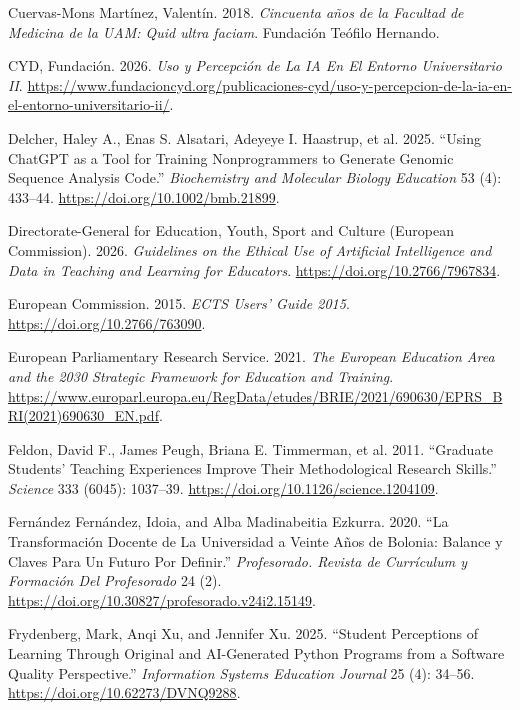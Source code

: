 \documentclass[
  11pt,
  a4paper,
  twoside]{scrreprt}
\newlength{\cslhangindent}
\newenvironment{CSLReferences}[2] %
 {\begin{list}{}{%
  \setlength{\itemindent}{0pt}
  \setlength{\leftmargin}{0pt}
  \setlength{\parsep}{0pt}
  \ifodd #1
   \setlength{\leftmargin}{\cslhangindent}
   \setlength{\itemindent}{-1\cslhangindent}
  \fi
  \setlength{\itemsep}{#2\baselineskip}}}
 {\end{list}}
\begin{document}
\begin{CSLReferences}{1}{1}
Cuervas-Mons Martínez, Valentín. 2018. \emph{Cincuenta años de la
Facultad de Medicina de la UAM: Quid ultra faciam}. Fundación Teófilo
Hernando.

CYD, Fundación. 2026. \emph{Uso y Percepción de La {IA} En El Entorno
Universitario {II}}.
\url{https://www.fundacioncyd.org/publicaciones-cyd/uso-y-percepcion-de-la-ia-en-el-entorno-universitario-ii/}.

Delcher, Haley A., Enas S. Alsatari, Adeyeye I. Haastrup, et al. 2025.
{``Using ChatGPT as a Tool for Training Nonprogrammers to Generate
Genomic Sequence Analysis Code.''} \emph{Biochemistry and Molecular
Biology Education} 53 (4): 433--44.
\url{https://doi.org/10.1002/bmb.21899}.

Directorate-General for Education, Youth, Sport and Culture (European
Commission). 2026. \emph{Guidelines on the Ethical Use of Artificial
Intelligence and Data in Teaching and Learning for Educators}.
\url{https://doi.org/10.2766/7967834}.

European Commission. 2015. \emph{ECTS Users{'} Guide 2015}.
\url{https://doi.org/10.2766/763090}.

European Parliamentary Research Service. 2021. \emph{The European
Education Area and the 2030 Strategic Framework for Education and
Training}.
\url{https://www.europarl.europa.eu/RegData/etudes/BRIE/2021/690630/EPRS_BRI(2021)690630_EN.pdf}.

Feldon, David F., James Peugh, Briana E. Timmerman, et al. 2011.
{``Graduate Students{'} Teaching Experiences Improve Their
Methodological Research Skills.''} \emph{Science} 333 (6045): 1037--39.
\url{https://doi.org/10.1126/science.1204109}.

Fernández Fernández, Idoia, and Alba Madinabeitia Ezkurra. 2020. {``La
Transformación Docente de La Universidad a Veinte Años de Bolonia:
Balance y Claves Para Un Futuro Por Definir.''} \emph{Profesorado.
Revista de Currículum y Formación Del Profesorado} 24 (2).
\url{https://doi.org/10.30827/profesorado.v24i2.15149}.

Frydenberg, Mark, Anqi Xu, and Jennifer Xu. 2025. {``Student Perceptions
of Learning Through Original and AI-Generated Python Programs from a
Software Quality Perspective.''} \emph{Information Systems Education
Journal} 25 (4): 34--56. \url{https://doi.org/10.62273/DVNQ9288}.


\end{CSLReferences}
\end{document}
